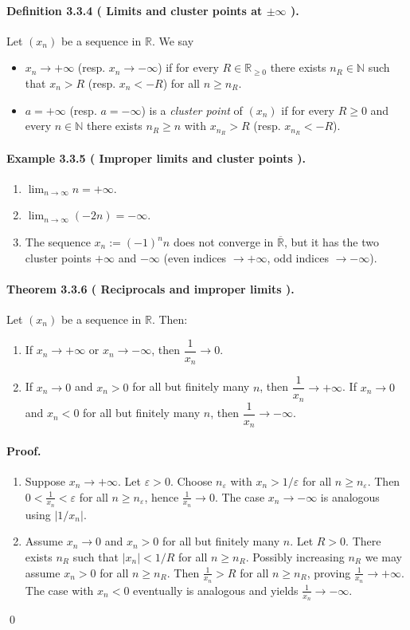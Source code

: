 \documentclass[12pt]{article}
\newcommand{\N}{\mathbb{N}}
\newcommand{\R}{\mathbb{R}}
\newcommand{\eps}{\varepsilon}
\newcommand{\NumberedDefinition}[3]{%
\paragraph*{Definition #1 ( #2 ).} #3\par}
\newcommand{\NumberedTheorem}[3]{%
\paragraph*{Theorem #1 ( #2 ).} #3\par}
\newcommand{\NumberedExample}[3]{%
\paragraph*{Example #1 ( #2 ).} #3\par}
\begin{document}
\NumberedDefinition{3.3.4}{Limits and cluster points at $\pm\infty$}{Let $(x_n)$ be a sequence in $\R$. We say
\begin{itemize}[leftmargin=*]
	\item $x_n\to +\infty$ (resp. $x_n\to -\infty$) if for every $R\in\R_{\ge0}$ there exists $n_R\in\N$ such that $x_n>R$ (resp. $x_n<-R$) for all $n\ge n_R$.
	\item $a=+\infty$ (resp. $a=-\infty$) is a \emph{cluster point} of $(x_n)$ if for every $R\ge 0$ and every $n\in\N$ there exists $n_R\ge n$ with $x_{n_R}>R$ (resp. $x_{n_R}< -R$).
\end{itemize}}

\NumberedExample{3.3.5}{Improper limits and cluster points}{
\begin{enumerate}[label={(\arabic*)}, leftmargin=*]
	\item $\displaystyle \lim_{n\to\infty} n = +\infty$.
	\item $\displaystyle \lim_{n\to\infty} (-2n) = -\infty$.
	\item The sequence $x_n:=(-1)^n n$ does not converge in $\overline{\R}$, but it has the two cluster points $+\infty$ and $-\infty$ (even indices $\to +\infty$, odd indices $\to -\infty$).
\end{enumerate}}

\NumberedTheorem{3.3.6}{Reciprocals and improper limits}{Let $(x_n)$ be a sequence in $\R$. Then:
\begin{enumerate}[label={(\arabic*)}, leftmargin=*]
	\item If $x_n\to +\infty$ or $x_n\to -\infty$, then $\dfrac{1}{x_n}\to 0$.
	\item If $x_n\to 0$ and $x_n>0$ for all but finitely many $n$, then $\dfrac{1}{x_n}\to +\infty$. If $x_n\to 0$ and $x_n<0$ for all but finitely many $n$, then $\dfrac{1}{x_n}\to -\infty$.
\end{enumerate}}

\paragraph{Proof.}
\begin{enumerate}[label={(\arabic*)}, leftmargin=*]
	\item Suppose $x_n\to +\infty$. Let $\eps>0$. Choose $n_\eps$ with $x_n>1/\eps$ for all $n\ge n_\eps$. Then $0<\tfrac{1}{x_n}<\eps$ for all $n\ge n_\eps$, hence $\tfrac{1}{x_n}\to 0$. The case $x_n\to -\infty$ is analogous using $|1/x_n|$.
	\item Assume $x_n\to 0$ and $x_n>0$ for all but finitely many $n$. Let $R>0$. There exists $n_R$ such that $|x_n|<1/R$ for all $n\ge n_R$. Possibly increasing $n_R$ we may assume $x_n>0$ for all $n\ge n_R$. Then $\tfrac{1}{x_n}>R$ for all $n\ge n_R$, proving $\tfrac{1}{x_n}\to +\infty$. The case with $x_n<0$ eventually is analogous and yields $\tfrac{1}{x_n}\to -\infty$.
\end{enumerate}\qed
\end{document}
